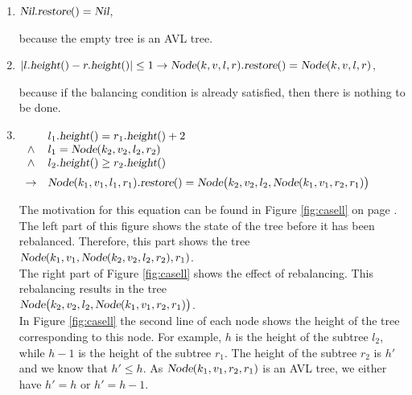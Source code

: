 \begin{enumerate}
\item $\textsl{Nil}.\textsl{restore}() = \textsl{Nil}$,

      because the empty tree is an  AVL tree.
\item $|l.\textsl{height}() - r.\textsl{height}()| \leq 1 \rightarrow 
       \textsl{Node}(k,v,l,r).\textsl{restore}() = \textsl{Node}(k,v,l,r)$,

      because if the balancing condition is already satisfied, then there is nothing to be done. 
\item $\begin{array}[t]{cl}
              & l_1.\textsl{height}() = r_1.\textsl{height}() + 2    \\ 
       \wedge & l_1 = \textsl{Node}(k_2,v_2,l_2,r_2)                 \\
       \wedge & l_2.\textsl{height}() \geq r_2.\textsl{height}()     \\[0.2cm]
       \rightarrow & \textsl{Node}(k_1,v_1,l_1,r_1).\textsl{restore}() = 
                     \textsl{Node}\bigl(k_2,v_2,l_2,\textsl{Node}(k_1,v_1,r_2,r_1)\bigr)
       \end{array}
      $

      The motivation for this equation can be found in Figure \ref{fig:casell}
      on page \pageref{fig:casell}.  The left part of this figure shows the state
      of the tree before it has been rebalanced.  Therefore, this part shows the tree
      \\[0.2cm]
      \hspace*{1.3cm}
      $\textsl{Node}(k_1,v_1, \textsl{Node}(k_2,v_2,l_2,r_2), r_1)$. 
      \\[0.2cm]
      The right part of Figure \ref{fig:casell} shows the effect of rebalancing.  
      This rebalancing results in the tree
      \\[0.2cm]
      \hspace*{1.3cm}
      $\textsl{Node}\bigl(k_2,v_2,l_2,\textsl{Node}(k_1,v_1,r_2,r_1)\bigr)$.
      \\[0.2cm]
      In Figure \ref{fig:casell} the second line of each node shows the height of the tree
      corresponding to this node.  For example,  $h$ is the height of the subtree 
      $l_2$, while $h-1$ is the height of the subtree $r_1$. The height of the subtree $r_2$
      is $h'$ and we know that $h' \leq h$.  As $\textsl{Node}(k_1,v_1,r_2,r_1)$ is an  AVL tree, we
      either have $h' = h$ or $h' = h-1$.


\end{enumerate}
